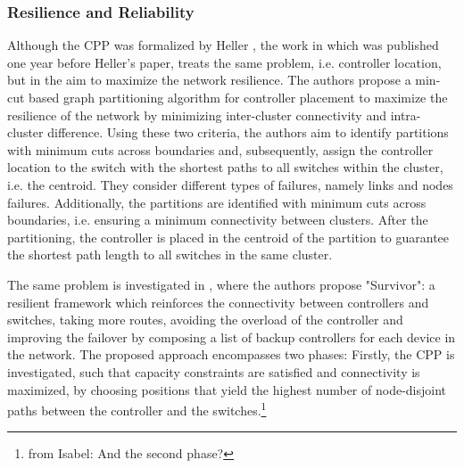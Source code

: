 \documentclass{IEEEtran}
\newcommand\fia[1]{{\color{red}\footnote{\color{red}from Isabel: #1}}} %
\begin{document}
\subsubsection{Resilience and Reliability}


Although the CPP was formalized by Heller \cite{HeSh12}, the work in \cite{ZhBe11} which was published one year before Heller's paper, treats the same problem, i.e. controller location, but in the aim to maximize the network resilience. The authors propose a min-cut based graph partitioning algorithm for controller placement to maximize the resilience of the network by minimizing inter-cluster connectivity and intra-cluster difference. Using these two criteria, the authors aim to identify partitions with minimum cuts across boundaries and, subsequently, assign the controller location to the switch with the shortest paths to all switches within the cluster, i.e. the centroid. They consider different types of failures, namely links and nodes failures. Additionally, the partitions are identified with minimum cuts across boundaries, i.e. ensuring a minimum connectivity between clusters. After the partitioning, the controller is placed in the centroid of the partition to guarantee the shortest path length to all switches in the same cluster.%

The same problem is investigated in \cite{MuOl14}, where the authors propose "Survivor": a resilient framework which reinforces the connectivity between controllers and switches, taking more routes, avoiding the overload of the controller and improving the failover by composing a list of backup controllers for each device in the network. The proposed approach encompasses two phases: Firstly, the CPP is investigated, such that capacity constraints are satisfied and connectivity is maximized, by choosing positions that yield the highest number of node-disjoint paths between the controller and the switches.\fia{And the second phase?} %
\end{document}
